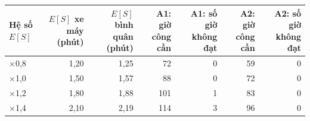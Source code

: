 \begin{tabular}{lrrrrrr}
\toprule
\textbf{Hệ số $E[S]$} & \textbf{$E[S]$ xe máy (phút)} & \textbf{$E[S]$ bình quân (phút)} & \textbf{A1: giờ công cần} & \textbf{A1: số giờ không đạt} & \textbf{A2: giờ công cần} & \textbf{A2: số giờ không đạt} \\
\midrule
$\times$0{,}8 & 1{,}20 & 1{,}25 & 72 & 0 & 59 & 0 \\
$\times$1{,}0 & 1{,}50 & 1{,}57 & 88 & 0 & 72 & 0 \\
$\times$1{,}2 & 1{,}80 & 1{,}88 & 101 & 1 & 83 & 0 \\
$\times$1{,}4 & 2{,}10 & 2{,}19 & 114 & 3 & 96 & 0 \\
\bottomrule
\end{tabular}
